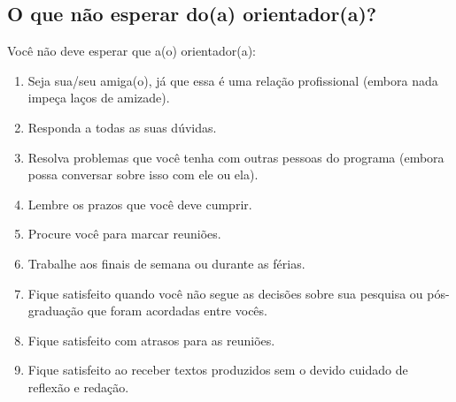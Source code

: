 \subsection{O que não esperar do(a) orientador(a)?}
Você não deve esperar que a(o) orientador(a):
\begin{enumerate}
\item Seja sua/seu amiga(o), já que essa é uma relação profissional
  (embora nada impeça laços de amizade).
\item Responda a todas as suas dúvidas.
\item Resolva problemas que você tenha com outras pessoas do programa
  (embora possa conversar sobre isso com ele ou ela).
\item Lembre os prazos que você deve cumprir.
\item Procure você para marcar reuniões.
\item Trabalhe aos finais de semana ou durante as férias.
\item Fique satisfeito quando você não segue as decisões sobre sua
  pesquisa ou pós-graduação que foram acordadas entre vocês.
\item Fique satisfeito com atrasos para as reuniões.
\item Fique satisfeito ao receber textos produzidos sem o devido
  cuidado de reflexão e redação.
\end{enumerate}


